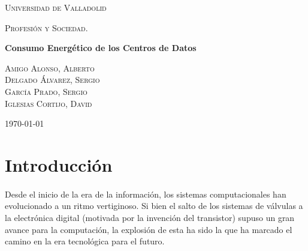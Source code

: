 \documentclass[12pt]{article}
\begin{document}
	\begin{titlepage}
      \centering
          {\scshape\LARGE Universidad de Valladolid \par}
          \vspace{1cm}
          {\scshape\Large Profesión y Sociedad.\par}
          \vspace{1.5cm}
          {\huge\bfseries Consumo Energético de los Centros de Datos \par}
          \vspace{2cm}
          {\large
          \textsc{Amigo Alonso, Alberto}\\[2mm] %
          \textsc{Delgado Álvarez, Sergio}\\[2mm] %
          \textsc{García Prado, Sergio}\\[2mm] %
          \textsc{Iglesias Cortijo, David}\\[2mm] %

          \vspace{-5mm}
          }

          \vfill
		{\large \today\par}
	\end{titlepage}


	\clearpage
	\tableofcontents


	\clearpage
  \section{Introducción}
	\label{sec:introducion}
    \paragraph{}
    Desde el inicio de la era de la información, los sistemas computacionales han evolucionado a un ritmo vertiginoso. Si bien el salto de los sistemas de válvulas a la electrónica digital (motivada por la invención del transistor) supuso un gran avance para la computación, la explosión de esta ha sido la que ha marcado el camino en la era tecnológica para el futuro. 
    
\end{document}
